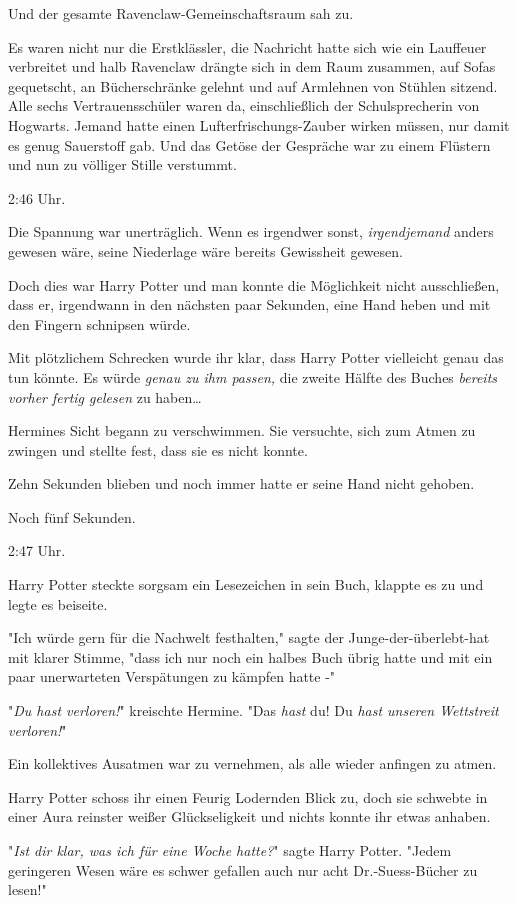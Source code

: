 {Und der gesamte Ravenclaw-Gemeinschaftsraum sah zu.

Es waren nicht nur die Erstklässler, die Nachricht hatte sich wie ein Lauffeuer verbreitet und halb Ravenclaw drängte sich in dem Raum zusammen, auf Sofas gequetscht, an Bücherschränke gelehnt und auf Armlehnen von Stühlen sitzend. Alle sechs Vertrauensschüler waren da, einschließlich der Schulsprecherin von Hogwarts. Jemand hatte einen Lufterfrischungs-Zauber wirken müssen, nur damit es genug Sauerstoff gab. Und das Getöse der Gespräche war zu einem Flüstern und nun zu völliger Stille verstummt.

2:46 Uhr.

Die Spannung war unerträglich. Wenn es irgendwer sonst, \emph{irgendjemand} anders gewesen wäre, seine Niederlage wäre bereits Gewissheit gewesen.

Doch dies war Harry Potter und man konnte die Möglichkeit nicht ausschließen, dass er, irgendwann in den nächsten paar Sekunden, eine Hand heben und mit den Fingern schnipsen würde.

Mit plötzlichem Schrecken wurde ihr klar, dass Harry Potter vielleicht genau das tun könnte. Es würde \emph{genau zu ihm passen,} die zweite Hälfte des Buches \emph{bereits vorher fertig gelesen} zu haben…

Hermines Sicht begann zu verschwimmen. Sie versuchte, sich zum Atmen zu zwingen und stellte fest, dass sie es nicht konnte.

Zehn Sekunden blieben und noch immer hatte er seine Hand nicht gehoben.

Noch fünf Sekunden.

2:47 Uhr.

Harry Potter steckte sorgsam ein Lesezeichen in sein Buch, klappte es zu und legte es beiseite.

"Ich würde gern für die Nachwelt festhalten," sagte der Junge-der-überlebt-hat mit klarer Stimme, "dass ich nur noch ein halbes Buch übrig hatte und mit ein paar unerwarteten Verspätungen zu kämpfen hatte -"

"\emph{Du hast verloren!}" kreischte Hermine. "Das \emph{hast} du! Du \emph{hast unseren Wettstreit verloren!}"

Ein kollektives Ausatmen war zu vernehmen, als alle wieder anfingen zu atmen.

Harry Potter schoss ihr einen Feurig Lodernden Blick zu, doch sie schwebte in einer Aura reinster weißer Glückseligkeit und nichts konnte ihr etwas anhaben.

"\emph{Ist dir klar, was ich für eine Woche hatte?}" sagte Harry Potter. "Jedem geringeren Wesen wäre es schwer gefallen auch nur acht Dr.-Suess-Bücher zu lesen!"

}
